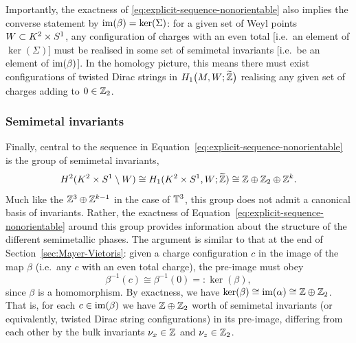 Importantly, the exactness of \eqref{eq:explicit-sequence-nonorientable} also implies the converse statement by $\operatorname{im}(\beta) = \ker(\Sigma)$: for a given set of Weyl points $W\subset K^2\times S^1$, any configuration of charges with an even total [i.e.\ an element of $\ker(\Sigma)$] must be realised in some set of semimetal invariants [i.e.\ be an element of $\operatorname{im}(\beta)$]. In the homology picture, this means there must exist configurations of twisted Dirac strings in $H_1\big(M, W;\widetilde{\mathbb{Z}}\big)$ realising any given set of charges adding to $0\in\mathbb{Z}_2$.

\subsubsection{Semimetal invariants}

Finally, central to the sequence in Equation~\eqref{eq:explicit-sequence-nonorientable} is the group of semimetal invariants,
\begin{equation}\label{eq:semimetal-group-nonor}
	H^2(K^2\times S^1\setminus W)\cong H_1(K^2\times S^1, W; \widetilde{\mathbb{Z}})\cong \mathbb{Z}\oplus\mathbb{Z}_2\oplus\mathbb{Z}^k.
\end{equation}
Much like the $\mathbb{Z}^3\oplus\mathbb{Z}^{k-1}$ in the case of $\mathbb{T}^3$, this group does not admit a canonical basis of invariants. Rather, the exactness of Equation~\eqref{eq:explicit-sequence-nonorientable} around this group provides information about the structure of the different semimetallic phases. The argument is similar to that at the end of Section~\ref{sec:Mayer-Vietoris}: given a charge configuration $c$ in the image of the map $\beta$ (i.e.\ any $c$ with an even total charge), the pre-image must obey
\begin{equation*}
	\beta^{-1}(c) \cong \beta^{-1}(0) =: \ker(\beta),
\end{equation*}
since $\beta$ is a homomorphism. By exactness, we have $\ker(\beta)\cong\operatorname{im}(\alpha)\cong\mathbb{Z}\oplus\mathbb{Z}_2$. That is, for each $c\in\operatorname{im}(\beta)$ we have $\mathbb{Z}\oplus\mathbb{Z}_2$ worth of semimetal invariants (or equivalently, twisted Dirac string configurations) in its pre-image, differing from each other by the bulk invariants $\nu_x\in\mathbb{Z}$ and $\nu_z\in\mathbb{Z}_2$.

